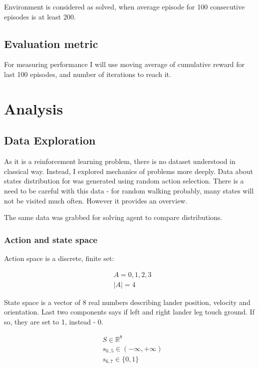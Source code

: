 \documentclass[12pt]{article}
\begin{document}
Environment is considered as solved, when average episode for 100 consecutive episodes is at least 200.

\subsection{Evaluation metric}

For measuring performance I will use moving average of cumulative reward for last 100 episodes, and number of iterations to reach it.

\section{Analysis}
\subsection{Data Exploration}

As it is a reinforcement learning problem, there is no dataset understood in classical way. Instead, I explored mechanics of problems more deeply. Data about states distribution for was generated using random action selection. There is a need to be careful with this data - for random walking probably, many states will not be visited much often. However it provides an overview.

The same data was grabbed for solving agent to compare distributions.

\subsubsection{Action and state space}

Action space is a discrete, finite set:

\begin{equation}
\begin{aligned}
&A = {0,1,2,3} \\
&|A| = 4
\end{aligned}
\end{equation}

State space is a vector of 8 real numbers describing lander position, velocity and orientation. Last two components says if left and right lander leg touch ground. If so, they are set to 1, instead - 0.

\begin{equation}
\begin{aligned}
&S \in \mathbb{R}^8 \\
&s_{0..5} \in (-\infty, +\infty) \\
&s_{6,7} \in \{0,1\} \\
\end{aligned}
\end{equation}
\end{document}
